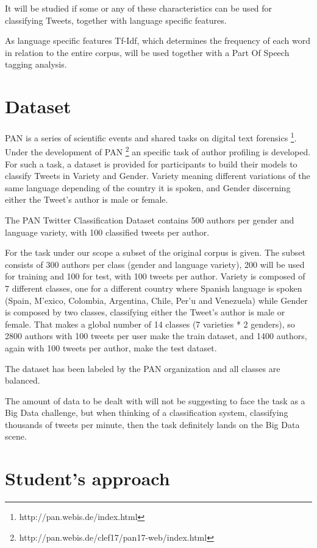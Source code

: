 \documentclass[11pt,a4paper]{article}
\begin{document}
It will be studied if some or any of these characteristics can be used for classifying Tweets, together with language specific features.

As language specific features Tf-Idf, which determines the frequency of each word in relation to the entire corpus, will be used together with a Part Of Speech tagging analysis.


\section{Dataset}

PAN is a series of scientific events and shared tasks on digital text forensics \footnote{http://pan.webis.de/index.html}. Under the development of PAN  \footnote{http://pan.webis.de/clef17/pan17-web/index.html} an specific task of author profiling is developed. For such a task, a dataset is provided for participants to build their models to classify Tweets in Variety and Gender. Variety meaning different variations of the same language depending of the country it is spoken, and Gender discerning either the Tweet's author is male or female. 

The PAN  Twitter Classification Dataset contains 500 authors per gender and language variety, with 100 classified tweets per author.

For the task under our scope a subset of the original corpus is given. The subset consists of 300 authors per class (gender and language variety), 200 will be used for training and 100 for test, with 100 tweets per author. Variety is composed of 7 different classes, one for a different country where Spanish language is spoken (Spain, M'exico, Colombia, Argentina, Chile, Per'u and Venezuela) while Gender is composed by two classes, classifying either the Tweet's author is male or female. That makes a global number of 14 classes (7 varieties * 2 genders), so 2800 authors with 100 tweets per user make the train dataset, and 1400 authors, again with 100 tweets per author, make the test dataset.

The dataset has been labeled by the PAN organization and all classes are balanced. 

The amount of data to be dealt with will not be suggesting to face the task as a Big Data challenge, but when thinking of a classification system, classifying thousands of tweets per minute, then the task definitely lands on the Big Data scene.
\newline
\section{Student's approach}
\end{document}
